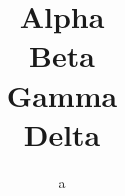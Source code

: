 \documentclass[12pt]{book}
\begin{document}
\title{Alpha\\[20pt] Beta\\ Gamma\\[0pt] Delta}
\author{a}\date{}\maketitle
\end{document}
